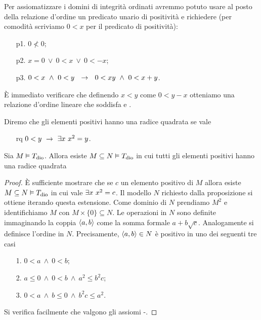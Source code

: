 Per assiomatizzare i domini di integrit\`a ordinati avremmo potuto usare al posto della relazione d'ordine un predicato unario di positivit\`a e richiedere (per comodit\`a scriviamo $0<x$ per il predicato di positivit\`a):
\begin{itemize}
\item[p1.] $0\not<0$;

\item[p2.] $x=0\ \vee\ 0<x\ \vee\ 0<-x$;

\item[p3.] $0<x\ \wedge\  0<y\ \ \imp\ \ 0<xy\ \wedge\  0<x+y$.
\end{itemize}
\`E immediato verificare che definendo $x<y$ come $0<y-x$ otteniamo una relazione d'ordine lineare che soddisfa  e . 

Diremo che gli elementi positivi hanno una radice quadrata se vale

\begin{itemize}
\item[rq]   $0<y\ \imp\ \E x\ x^2=y$.
\end{itemize}


\begin{proposition}\label{prop_radicidipositivi}
Sia $M\models T_{\rm dio}$. Allora esiste $M\subseteq N\models T_{\rm dio}$ in cui tutti gli elementi positivi hanno una radice quadrata
\end{proposition}

\begin{proof}
\`E sufficiente mostrare che se $c$ un elemento positivo di $M$ allora esiste $M\subseteq N\models T_{\rm dio}$ in cui vale $\E x\ x^2=c$. Il modello $N$ richiesto dalla proposizione si ottiene iterando questa estensione. Come dominio di $N$ prendiamo $M^2$ e identifichiamo $M$ con $M\times\{0\}\subseteq N$. Le operazioni in $N$ sono definite immaginando la coppia $\<a,b\>$ come la somma formale $a+b\sqrt{c}$. Analogamente si definisce l'ordine in $N$. Precisamente, $\<a,b\>\in N$ \`e positivo in uno dei seguenti tre casi
\begin{itemize}
\item[1.] $0<a\ \wedge\ 0<b$;
\item[2.] $a\le0\ \wedge\ 0<b\ \wedge\  a^2\le b^2 c$;
\item[3.] $0<a\ \wedge\ b\le0\ \wedge\  b^2c\le a^2$.
\end{itemize}

Si verifica facilmente che valgono gli assiomi -.
\end{proof}


